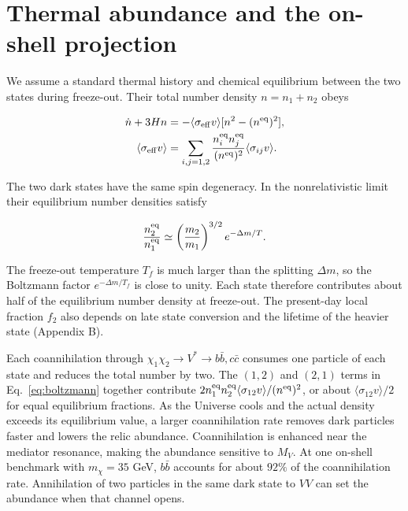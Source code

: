 \documentclass[aps,prd,reprint,superscriptaddress,longbibliography,floatfix]{revtex4-2}
\begin{document}
\section{Thermal abundance and the on-shell projection}
\label{sec:abundance}

We assume a standard thermal history and chemical equilibrium between
the two states during freeze-out. Their total number density $n=n_1+n_2$
obeys

\begin{equation}
\label{eq:boltzmann}
\begin{aligned}
\dot n+3Hn&=-\langle\sigma_{\rm eff}v\rangle[n^2-(n^{\rm eq})^2],\\
\langle\sigma_{\rm eff}v\rangle
&=\sum_{i,j=1,2}\frac{n_i^{\rm eq}n_j^{\rm eq}}{(n^{\rm eq})^2}\langle\sigma_{ij}v\rangle .
\end{aligned}
\end{equation}

The two dark states have the same spin degeneracy. In the
nonrelativistic limit their equilibrium number densities satisfy

\begin{equation*}
\frac{n_2^{\rm eq}}{n_1^{\rm eq}}\simeq\left(\frac{m_2}{m_1}\right)^{3/2}e^{-\Delta m/T}.
\end{equation*}

The freeze-out temperature $T_f$ is much larger than the splitting
$\Delta m$, so the Boltzmann factor $e^{-\Delta m/T_f}$ is close to
unity. Each state therefore contributes about half of the equilibrium
number density at freeze-out. The present-day local fraction $f_2$ also
depends on late state conversion and the lifetime of the heavier state
(Appendix B).

Each coannihilation through $\chi_1\chi_2\to V^*\to b\bar b,c\bar c$
consumes one particle of each state and reduces the total number by two.
The $(1,2)$ and $(2,1)$ terms in
Eq.~\eqref{eq:boltzmann} together contribute
$2n_1^{\rm eq}n_2^{\rm eq}\langle\sigma_{12}v\rangle/(n^{\rm eq})^2$, or
about $\langle\sigma_{12}v\rangle/2$ for equal equilibrium fractions. As
the Universe cools and the actual density exceeds its equilibrium value,
a larger coannihilation rate removes dark particles faster and lowers
the relic abundance. Coannihilation is enhanced near the mediator
resonance, making the abundance sensitive to $M_V$. At one on-shell
benchmark with $m_\chi=35$ GeV, $b\bar b$ accounts for about $92\%$ of
the coannihilation rate. Annihilation of two particles in the same dark
state to $VV$ can set the abundance when that channel opens.
\cite{griest1991,gondolo1991}
\end{document}
